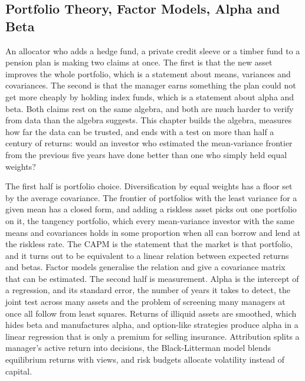 
\begin{chapterrefs}
\setcounter{chapter}{6}
\chapter{Portfolio Theory, Factor Models, Alpha and Beta}
\label{ch:portfolio}

An allocator who adds a hedge fund, a private credit sleeve or a timber fund to a pension plan is
making two claims at once. The first is that the new asset improves the whole portfolio, which is a
statement about means, variances and covariances. The second is that the manager earns something
the plan could not get more cheaply by holding index funds, which is a statement about alpha and
beta. Both claims rest on the same algebra, and both are much harder to verify from data than the
algebra suggests. This chapter builds the algebra, measures how far the data can be trusted, and
ends with a test on more than half a century of returns: would an investor who estimated the
mean-variance frontier from the previous five years have done better than one who simply held equal
weights?

The first half is portfolio choice. Diversification by equal weights has a floor set by the average covariance. The
frontier of portfolios with the least variance for a given mean has a closed form, and adding a
riskless asset picks out one portfolio on it, the tangency portfolio, which every mean-variance
investor with the same means and covariances holds in some proportion when all can borrow and lend
at the riskless rate. The CAPM is the statement that the market is that portfolio, and
it turns out to be equivalent to a linear relation between expected returns and betas. Factor models
generalise the relation and give a covariance matrix that can be estimated. The second half is
measurement. Alpha is the intercept of a regression, and its standard error, the number of years it
takes to detect, the joint test across many assets and the problem of screening many managers at
once all follow from least squares. Returns of illiquid assets are smoothed, which hides beta and
manufactures alpha, and option-like strategies produce alpha in a linear regression that is only a
premium for selling insurance. Attribution splits a manager's active return into decisions, the
Black-Litterman model blends equilibrium returns with views, and risk budgets allocate volatility
instead of capital.


\end{chapterrefs}
